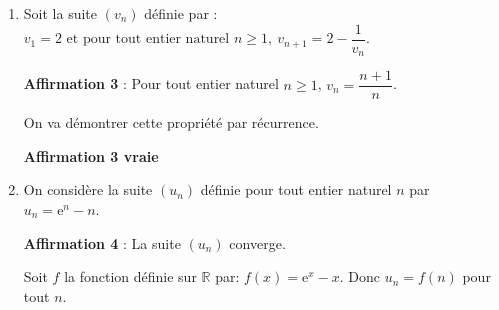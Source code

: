\documentclass[10pt]{article}
\providecommand{\blue}{\color{blue}}
\providecommand{\R}{\mathbb{R}}
\providecommand{\e}{{\mathrm{e}}}
\providecommand{\blue}{\color{blue}}
\providecommand{\ds}{\displaystyle}
\begin{document}
\begin{enumerate}
Donc, d'après le théorème des gendarmes, on peut déduire que la suite $(u_n)$ est convergente et que $\ds\lim_{n\to +\infty} u_n=3$.

\hfill{\blue\bf Affirmation 2 vraie}	

\item Soit la suite $\left(v_n\right)$ définie par :
$ v_1=2 \text{ et pour tout entier naturel } n\geqslant1,~v_{n+1}=2-\dfrac{1}{v_n}. $
	
\textbf{Affirmation 3} : Pour tout entier naturel $n \geqslant 1$, $v_{n}=\dfrac{n+1}{n}$.
	
\smallskip
	
On va démontrer cette propriété par récurrence.

	
\hfill{\blue\bf Affirmation 3 vraie}		
	
\item On considère la suite $\left(u_n\right)$ définie pour tout entier naturel $n$ par $u_n = \e^n-n$.
	
	\textbf{Affirmation 4} : La suite $\left(u_n\right)$ converge.
	
	\smallskip
	
Soit $f$ la fonction définie sur $\R$ par: $f(x)= \e^{x}-x$. Donc $u_n=f(n)$ pour tout $n$.


\end{enumerate}
\end{document}
